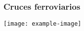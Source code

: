 \subsubsection{Cruces ferroviarios}

\lipsum[1]

\lipsum[1]
\texttt{[image: example-image]}
\lipsum[1]